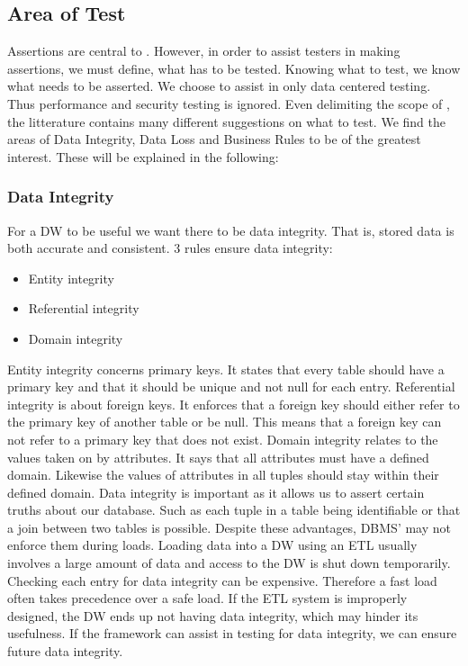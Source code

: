 \subsection{Area of Test}
Assertions are central to \FW{}. However, in order to assist testers in making assertions, we must define, what has to be tested. Knowing what to test, we know what needs to be asserted. We choose \FW{} to assist in only data centered testing. Thus performance and security testing is ignored.  Even delimiting the scope of \FW{}, the litterature contains many different suggestions on what to test. We find the areas of Data Integrity, Data Loss and Business Rules to be of the greatest interest. These will be explained in the following: 

\subsubsection{Data Integrity}
For a DW to be useful we want there to be data integrity. That is, stored data is both accurate and consistent. 3 rules ensure data integrity:

\begin{itemize}
\item Entity integrity
\item Referential integrity
\item Domain integrity
\end{itemize}

Entity integrity concerns primary keys. It states that every table should have a primary key and that it should be unique and not null for each entry. Referential integrity is about foreign keys. It enforces that a foreign key should either refer to the primary key of another table or be null. This means that a foreign key can not refer to a primary key that does not exist. Domain integrity relates to the values taken on by attributes. It says that all attributes must have a defined domain. Likewise the values of attributes in all tuples should stay within their defined domain. Data integrity is important as it allows us to assert certain truths about our database. Such as each tuple in a table being identifiable or that a join between two tables is possible. Despite these advantages, DBMS' may not enforce them during loads. Loading data into a DW using an ETL usually involves a large amount of data and access to the DW is shut down temporarily. Checking each entry for data integrity can be expensive. Therefore a fast load often takes precedence over a safe load. If the ETL system is improperly designed, the DW ends up not having data integrity, which may hinder its usefulness. If the framework can assist in testing for data integrity, we can ensure future data integrity.

